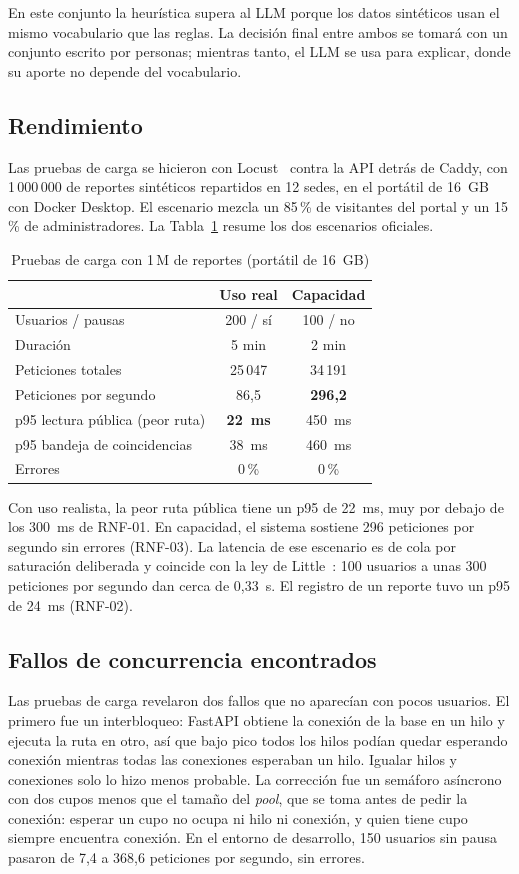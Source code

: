 \documentclass[conference]{IEEEtran}
\newcommand{\pc}{\,\%}
\begin{document}
En este conjunto la heurística supera al LLM porque los datos sintéticos usan el mismo vocabulario que las reglas. La decisión final entre ambos se tomará con un conjunto escrito por personas; mientras tanto, el LLM se usa para explicar, donde su aporte no depende del vocabulario.

\subsection{Rendimiento}
Las pruebas de carga se hicieron con Locust~\cite{locust} contra la API detrás de Caddy, con 1\,000\,000 de reportes sintéticos repartidos en 12 sedes, en el portátil de 16~GB con Docker Desktop. El escenario mezcla un 85\pc{} de visitantes del portal y un 15\pc{} de administradores. La Tabla~\ref{tab:carga} resume los dos escenarios oficiales.

\begin{table}[t]
\centering
\caption{Pruebas de carga con 1\,M de reportes (portátil de 16~GB)}
\label{tab:carga}
\begin{tabular}{@{}lcc@{}}
\toprule
 & Uso real & Capacidad \\
\midrule
Usuarios / pausas & 200 / sí & 100 / no \\
Duración & 5 min & 2 min \\
Peticiones totales & 25\,047 & 34\,191 \\
Peticiones por segundo & 86,5 & \textbf{296,2} \\
p95 lectura pública (peor ruta) & \textbf{22~ms} & 450~ms \\
p95 bandeja de coincidencias & 38~ms & 460~ms \\
Errores & 0\pc & 0\pc \\
\bottomrule
\end{tabular}
\end{table}

Con uso realista, la peor ruta pública tiene un p95 de 22~ms, muy por debajo de los 300~ms de RNF-01. En capacidad, el sistema sostiene 296 peticiones por segundo sin errores (RNF-03). La latencia de ese escenario es de cola por saturación deliberada y coincide con la ley de Little~\cite{little1961}: 100 usuarios a unas 300 peticiones por segundo dan cerca de 0,33~s. El registro de un reporte tuvo un p95 de 24~ms (RNF-02).

\subsection{Fallos de concurrencia encontrados}
Las pruebas de carga revelaron dos fallos que no aparecían con pocos usuarios. El primero fue un interbloqueo: FastAPI obtiene la conexión de la base en un hilo y ejecuta la ruta en otro, así que bajo pico todos los hilos podían quedar esperando conexión mientras todas las conexiones esperaban un hilo. Igualar hilos y conexiones solo lo hizo menos probable. La corrección fue un semáforo asíncrono con dos cupos menos que el tamaño del \emph{pool}, que se toma antes de pedir la conexión: esperar un cupo no ocupa ni hilo ni conexión, y quien tiene cupo siempre encuentra conexión. En el entorno de desarrollo, 150 usuarios sin pausa pasaron de 7,4 a 368,6 peticiones por segundo, sin errores.
\end{document}

